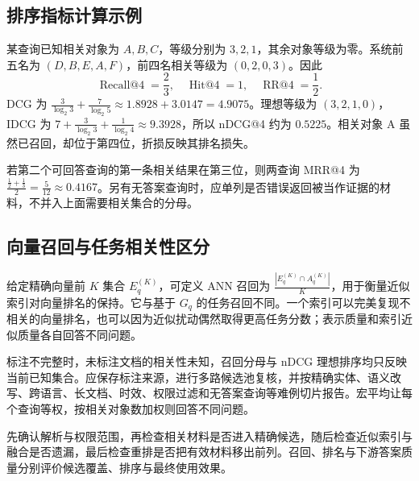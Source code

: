 \documentclass[../textbook.tex]{subfiles}
\begin{document}
\subsection{排序指标计算示例}
\begin{example}


某查询已知相关对象为 $A,B,C$，等级分别为 $3,2,1$，其余对象等级为零。系统前五名为 $(D,B,E,A,F)$，前四名相关等级为 $(0,2,0,3)$。因此
\begin{equation}
\operatorname{Recall@4}=\frac{2}{3},\quad \operatorname{Hit@4}=1,\quad \operatorname{RR@4}=\frac{1}{2}.
\end{equation}
DCG 为 $\frac{3}{\log_2 3}+\frac{7}{\log_2 5}\approx1.8928+3.0147=4.9075$。理想等级为 $(3,2,1,0)$，IDCG 为 $7+\frac{3}{\log_2 3}+\frac{1}{\log_2 4}\approx9.3928$，所以 nDCG@4 约为 $0.5225$。相关对象 A 虽然已召回，却位于第四位，折损反映其排名损失。

若第二个可回答查询的第一条相关结果在第三位，则两查询 MRR@4 为 $\frac{\frac{1}{2}+\frac{1}{3}}{2}=\frac{5}{12}\approx0.4167$。另有无答案查询时，应单列是否错误返回被当作证据的材料，不并入上面需要相关集合的分母。
\end{example}

\subsection{向量召回与任务相关性区分}
给定精确向量前 $K$ 集合 $E_q^{(K)}$，可定义 ANN 召回为 $\frac{|E_q^{(K)}\cap A_q^{(K)}|}{K}$，用于衡量近似索引对向量排名的保持。它与基于 $G_q$ 的任务召回不同。一个索引可以完美复现不相关的向量排名，也可以因为近似扰动偶然取得更高任务分数；表示质量和索引近似质量各自回答不同问题。

标注不完整时，未标注文档的相关性未知，召回分母与 nDCG 理想排序均只反映当前已知集合。应保存标注来源，进行多路候选池复核，并按精确实体、语义改写、跨语言、长文档、时效、权限过滤和无答案查询等难例切片报告。宏平均让每个查询等权，按相关对象数加权则回答不同问题。

\begin{tip}[检索故障的定位顺序]
先确认解析与权限范围，再检查相关材料是否进入精确候选，随后检查近似索引与融合是否遗漏，最后检查重排是否把有效材料移出前列。召回、排名与下游答案质量分别评价候选覆盖、排序与最终使用效果。
\end{tip}



\chapterreferences
\myendchapterdocument
\end{document}
